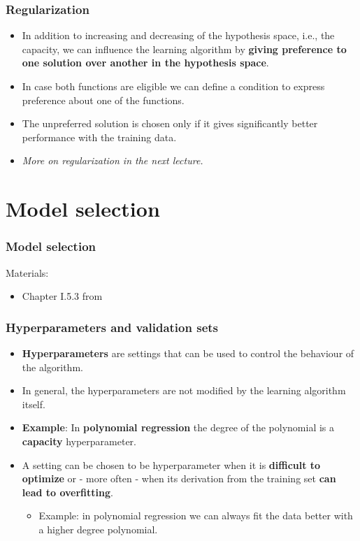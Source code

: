 \documentclass[notes]{beamer}          %
\begin{document}
\begin{frame}
\frametitle{Regularization}
    \begin{itemize}
        \item In addition to increasing and decreasing of the hypothesis space, i.e., the capacity, we can influence the learning algorithm by \textbf{giving preference to one solution over another in the hypothesis space}.
        \item In case both functions are eligible we can define a condition to express preference about one of the functions.
        \item The unpreferred solution is chosen only if it gives significantly better performance with the training data.
        \item \textit{More on regularization in the next lecture.}
    \end{itemize}
\end{frame}

\section{Model selection}

\begin{frame}
\frametitle{Model selection}
Materials:
\begin{itemize}
    \item Chapter I.5.3 from \cite{deeplearning}
\end{itemize}
\end{frame}

\begin{frame}
\frametitle{Hyperparameters and validation sets}
    \begin{itemize}
        \item {\bf Hyperparameters} are settings that can be used to control the behaviour of the algorithm.
        \item In general, the hyperparameters are not modified by the learning algorithm itself.
        \item {\bf Example}: In {\bf polynomial regression} the degree of the polynomial is a {\bf capacity} hyperparameter.
        \item A setting can be chosen to be hyperparameter when it is {\bf difficult to optimize} or - more often - when its derivation from the training set {\bf can lead to overfitting}.
        \begin{itemize}
            \item Example: in polynomial regression we can always fit the data better with a higher degree polynomial.
        \end{itemize}
    \end{itemize}
\end{frame}
\end{document}
